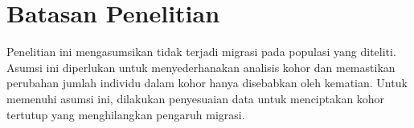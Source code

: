 \section{Batasan Penelitian}

 Penelitian ini mengasumsikan tidak terjadi migrasi pada populasi yang diteliti. Asumsi ini diperlukan untuk menyederhanakan analisis kohor dan memastikan perubahan jumlah individu dalam kohor hanya disebabkan oleh kematian. Untuk memenuhi asumsi ini, dilakukan penyesuaian data untuk menciptakan kohor tertutup yang menghilangkan pengaruh migrasi.